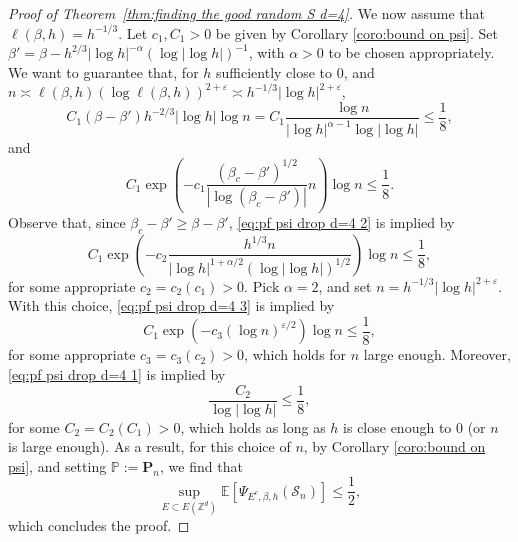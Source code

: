\documentclass[10pt,a4paper]{amsart}
\numberwithin{equation}{section}
\begin{document}
\begin{proof}[Proof of Theorem~\textup{\ref{thm:finding the good random S d=4}}]
We now assume that $\ell(\beta,h)=h^{-1/3}$. Let $c_1,C_1>0$ be given by Corollary \ref{coro:bound on psi}. Set $\beta'=\beta-h^{2/3}|\log h|^{-\alpha}(\log |\log h|)^{-1}$, with $\alpha>0$ to be chosen appropriately. We want to guarantee that, for $h$ sufficiently close to $0$, and $n\asymp\ell(\beta,h)(\log \ell(\beta,h))^{2+\varepsilon}\asymp h^{-1/3}|\log h|^{2+\varepsilon}$,
\begin{equation}\label{eq:pf psi drop d=4 1}
	C_1(\beta-\beta')h^{-2/3}|\log h| \log n=C_1\frac{\log n}{|\log h|^{\alpha-1}\log |\log h|}\leq \frac{1}{8},
\end{equation}
and
\begin{equation}\label{eq:pf psi drop d=4 2}
	C_1\exp\left(-c_1\frac{(\beta_c-\beta')^{1/2}}{|\log (\beta_c-\beta')|}n\right)\log n\leq \frac{1}{8}.
\end{equation}
Observe that, since $\beta_c-\beta'\geq \beta-\beta'$, \eqref{eq:pf psi drop d=4 2} is implied by
\begin{equation}\label{eq:pf psi drop d=4 3}
C_1\exp\left(-c_2\frac{h^{1/3}n}{|\log h|^{1+\alpha/2}(\log |\log h|)^{1/2}} \right)\log n\leq \frac{1}{8},
\end{equation}
for some appropriate $c_2=c_2(c_1)>0$.
Pick $\alpha=2$, and set $n=h^{-1/3}|\log h|^{2+\varepsilon}$. With this choice, \eqref{eq:pf psi drop d=4 3} is implied by
\begin{equation}\label{eq: where eps becomes crucial}
	C_1\exp(-c_3 (\log n)^{\varepsilon/2})\log n\leq \frac{1}{8},
\end{equation}
for some appropriate $c_3=c_3(c_2)>0$,
which holds for $n$ large enough. Moreover, \eqref{eq:pf psi drop d=4 1} is implied by
\begin{equation}
	\frac{C_2}{\log |\log h|}\leq \frac{1}{8},
\end{equation}
for some $C_2=C_2(C_1)>0$, which holds as long as $h$ is close enough to $0$ (or $n$ is large enough). As a result, for this choice of $n$, by Corollary \ref{coro:bound on psi}, and setting $\mathbb P:=\mathbf P_n$, we find that
\begin{equation}
	\sup_{E\subset E(\mathbb Z^d)}\mathbb E[\Psi_{E^c,\beta,h}(\mathcal S_n)]\leq \frac{1}{2},
\end{equation}
	which concludes the proof.
\end{proof}
\end{document}
